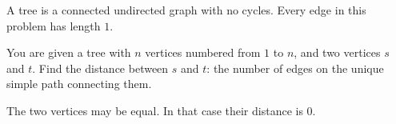 A tree is a connected undirected graph with no cycles. Every edge in this problem has length $1$.

You are given a tree with $n$ vertices numbered from $1$ to $n$, and two vertices $s$ and $t$. Find the distance between $s$ and $t$: the number of edges on the unique simple path connecting them.

The two vertices may be equal. In that case their distance is $0$.
